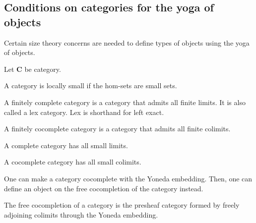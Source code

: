 \subsection{Conditions on categories for the yoga of objects}

Certain size theory concerns are needed to define types of objects using the yoga of objects.

\begin{definition}
    Let $\mathbf{C}$ be category.

    A category is locally small if the hom-sets are small sets.
\end{definition}

\begin{definition}
    \label{definition-finitely-complete}
    A finitely complete category is a category that admits all finite limits. It is also called a lex category. Lex is shorthand for left exact. 
\end{definition}

\begin{definition}
    \label{definition-finitely-cocomplete}
    A finitely cocomplete category is a category that admits all finite colimits.
\end{definition}

\begin{definition}
    \label{definition-complete}
    A complete category has all small limits.
\end{definition}

\begin{definition}
    \label{definition-cocomplete}
    A cocomplete category has all small colimits.
\end{definition}

One can make a category cocomplete with the Yoneda embedding.
Then, one can define an object on the free cocompletion of the category instead.

\begin{definition}
    \label{definition-free-cocompletion}
    The free cocompletion of a category is the presheaf category formed by freely adjoining colimits through the Yoneda embedding.
\end{definition}

